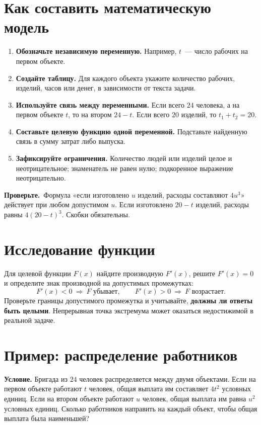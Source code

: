\documentclass[a4paper,12pt]{article}
\newcommand{\caution}[1]{\par\noindent\textcolor{darkaccent}{\textbf{Проверьте.}}~#1\par}
\begin{document}
\section{Как составить математическую модель}
\begin{enumerate}
\item \textbf{Обозначьте независимую переменную.} Например, $t$~--- число рабочих на первом объекте.
\item \textbf{Создайте таблицу.} Для каждого объекта укажите количество рабочих, изделий, часов или денег, в зависимости от текста задачи.
\item \textbf{Используйте связь между переменными.} Если всего $24$ человека, а на первом объекте $t$, то на втором $24-t$. Если всего $20$ изделий, то $t_1+t_2=20$.
\item \textbf{Составьте целевую функцию одной переменной.} Подставьте найденную связь в сумму затрат либо выпуска.
\item \textbf{Зафиксируйте ограничения.} Количество людей или изделий целое и неотрицательное; знаменатель не равен нулю; подкоренное выражение неотрицательно.
\end{enumerate}

\caution{Формула «если изготовлено $u$ изделий, расходы составляют $4u^3$» действует при любом допустимом $u$. Если изготовлено $20-t$ изделий, расходы равны $4(20-t)^3$. Скобки обязательны.}

\section{Исследование функции}
Для целевой функции $F(x)$ найдите производную $F'(x)$, решите $F'(x)=0$ и определите знак производной на допустимых промежутках:
\[
F'(x)<0\ \Rightarrow\ F\text{ убывает},\qquad
F'(x)>0\ \Rightarrow\ F\text{ возрастает}.
\]
Проверьте границы допустимого промежутка и учитывайте, \textbf{должны ли ответы быть целыми}. Непрерывная точка экстремума может оказаться недостижимой в реальной задаче.

\endgroup
\begingroup{}\setlength{\parskip}{2pt}
\section{Пример: распределение работников}
\textbf{Условие.} Бригада из $24$ человек распределяется между двумя объектами. Если на первом объекте работают $t$ человек, общая выплата им составляет $4t^2$ условных единиц. Если на втором объекте работают $u$ человек, общая выплата им равна $u^2$ условных единиц. Сколько работников направить на каждый объект, чтобы общая выплата была наименьшей?
\end{document}
